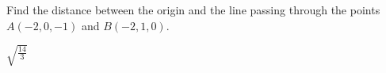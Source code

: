 
\begin{Exercise}[
name={},
title={}, 
difficulty=0,
origin={\cite{BS}}]
Find the distance between the origin and the line passing through the points $A(-2, 0, -1)$ and $B(-2, 1, 0)$.
\end{Exercise}
\begin{Answer}
$\sqrt{\frac{14}{3}}$
\end{Answer}
